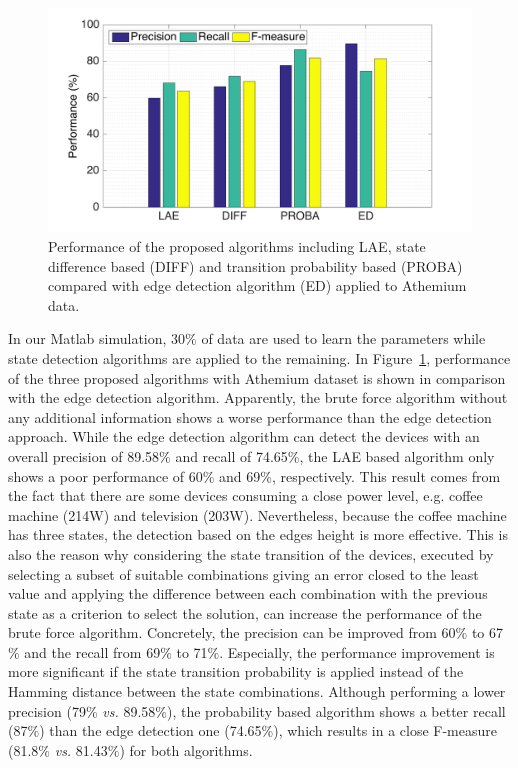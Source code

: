 \begin{figure}
\centering
\includegraphics[width=.8\textwidth]{./chapters/chapter3/images/l1_perf.pdf} 
\caption{Performance of the proposed algorithms including LAE, state difference based (DIFF) and transition probability based (PROBA) compared with edge detection algorithm (ED) applied to Athemium data.}
\label{fig:L4} 
\end{figure}
In our Matlab simulation, 30$\%$ of data are used to learn the parameters while state detection algorithms are applied to the remaining.
In Figure~\ref{fig:L4}, performance of the three proposed algorithms with Athemium dataset is shown in comparison with the edge detection algorithm. Apparently, the brute force algorithm without any additional information shows a worse performance than the edge detection approach. While the edge detection algorithm can detect the devices with an overall precision of 89.58$\%$ and recall of 74.65$\%$, the LAE based algorithm only shows a poor performance of 60$\%$ and 69$\%$, respectively. This result comes from the fact that there are some devices consuming a close power level, e.g. coffee machine (214W) and television (203W). Nevertheless, because the coffee machine has three states, the detection based on the edges height is more effective. This is also the reason why considering the state transition of the devices, executed by selecting a subset of suitable combinations giving an error closed to the least value and applying the difference between each combination with the previous state as a criterion to select the solution, can increase the performance of the brute force algorithm. Concretely, the precision can be improved from 60$\%$ to 67$\%$ and the recall from 69$\%$ to 71$\%$. Especially, the performance improvement is more significant if the state transition probability is applied instead of the Hamming distance between the state combinations. Although performing a lower precision (79$\%$ \emph{vs.} 89.58$\%$), the probability based algorithm shows a better recall (87$\%$) than the edge detection one (74.65$\%$), which results in a close F-measure (81.8$\%$ \emph{vs.} 81.43$\%$) for both algorithms.

